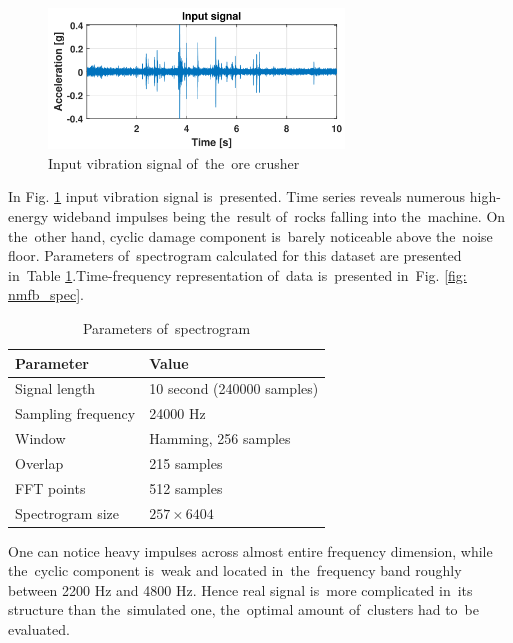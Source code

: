 \begin{figure}[!ht]
\centering
\includegraphics[width = 0.7\textwidth]{wykresy/nmfb_raw}
\caption{Input vibration signal of~the~ore crusher}
\label{fig: nmfb_raw}
\end{figure}

In Fig. \ref{fig: nmfb_raw} input vibration signal is~presented. Time series reveals numerous high-energy wideband impulses being the~result of~rocks falling into the~machine. On the~other hand, cyclic damage component is~barely noticeable above the~noise floor. Parameters of~spectrogram calculated for this dataset are presented in~Table \ref{tab:tab2}.Time-frequency representation of~data is~presented in~Fig. \ref{fig: nmfb_spec}.


\begin{table}[ht!]
  \centering
  \caption{Parameters of~spectrogram}
 \begin{tabular}{|l|l|}
  \hline
  \textbf{Parameter} & \textbf{Value} \\ \hline
     Signal length & 10 second (240000 samples) \\ \hline
     Sampling frequency & 24000 Hz \\ \hline
     Window & Hamming, 256 samples \\ \hline
     Overlap & 215 samples \\ \hline
     FFT points & 512 samples \\ \hline
     Spectrogram size & $257 \times 6404$ \\

  \hline
  \end{tabular}
  \label{tab:tab2}
\end{table}

One can notice heavy impulses across almost entire frequency dimension, while the~cyclic component is~weak and located in~the~frequency band roughly between 2200 Hz and 4800 Hz. Hence real signal is~more complicated in~its structure than the~simulated one, the~optimal amount of~clusters had to~be evaluated.

